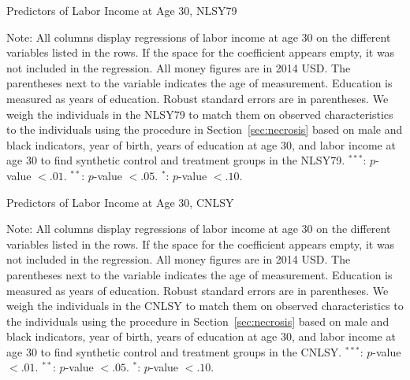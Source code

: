 \begin{table} 
\begin{threeparttable}
\caption{Predictors of Labor Income at Age 30, NLSY79}
\label{table:prednlsy}
\centering 
\footnotesize

\begin{tablenotes}
\footnotesize
\item Note: All columns display regressions of labor income at age 30 on the different variables listed in the rows. If the space for the coefficient appears empty, it was not included in the regression. All money figures are in 2014 USD. The parentheses next to the variable indicates the age of measurement. Education is measured as years of education. Robust standard errors are in parentheses. We weigh the individuals in the NLSY79 to match them on observed characteristics to the individuals using the procedure in Section~\ref{sec:necrosis} based on male and black indicators, year of birth, years of education at age 30, and labor income at age 30 to find synthetic control and treatment groups in the NLSY79. $^{***}$: $p$-value $< .01$. $^{**}$: $p$-value $< .05$. $^{*}$: $p$-value $< .10$.
\end{tablenotes}
\end{threeparttable}
\end{table}

\begin{table} 
\begin{threeparttable}
\caption{Predictors of Labor Income at Age 30, CNLSY}
\label{table:predcnlsy}
\centering 
\footnotesize

\begin{tablenotes}
\footnotesize
\item  Note: All columns display regressions of labor income at age 30 on the different variables listed in the rows. If the space for the coefficient appears empty, it was not included in the regression. All money figures are in 2014 USD. The parentheses next to the variable indicates the age of measurement. Education is measured as years of education. Robust standard errors are in parentheses. We weigh the individuals in the CNLSY to match them on observed characteristics to the individuals using the procedure in Section~\ref{sec:necrosis} based on male and black indicators, year of birth, years of education at age 30, and labor income at age 30 to find synthetic control and treatment groups in the CNLSY. $^{***}$: $p$-value $< .01$. $^{**}$: $p$-value $< .05$. $^{*}$: $p$-value $< .10$.
\end{tablenotes}
\end{threeparttable}
\end{table}


